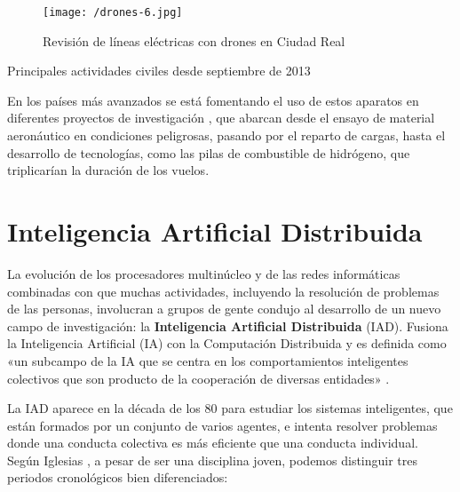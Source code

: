 \begin{figure}[!h]
\begin{center}
\texttt{[image: /drones-6.jpg]}
\caption[Revisión de líneas eléctricas con drones en Ciudad Real]{Revisión de líneas eléctricas con drones en Ciudad Real \cite{unionfenosa}}
\label{fig:unionfenosa}
\end{center}
\end{figure}

\begin{table}[!h]
 \centering
 {\small
 
 }
 \caption[Principales actividades civiles desde septiembre de 2013]
 {Principales actividades civiles desde septiembre de 2013 \cite{ambitocivil2}}
 \label{tab:ambitocivil2}
\end{table}

En los países más avanzados se está fomentando el uso de estos aparatos en diferentes proyectos de investigación \cite{UA}, que abarcan desde el ensayo de material aeronáutico en condiciones peligrosas, pasando por el reparto de cargas, hasta el desarrollo de tecnologías, como las pilas de combustible de hidrógeno, que triplicarían la duración de los vuelos.

\clearpage

\section{Inteligencia Artificial Distribuida}
\label{sec:inteligenciaartificial}

La evolución de los procesadores multinúcleo y de las redes informáticas combinadas con que muchas actividades, incluyendo la resolución de problemas de las personas, involucran a grupos de gente condujo al desarrollo de un nuevo campo de investigación: la \textbf{Inteligencia Artificial Distribuida} (\acs{IAD}). Fusiona la Inteligencia Artificial (\acs{IA}) con la Computación Distribuida y es definida como «un subcampo de la \acs{IA} que se centra en los comportamientos inteligentes colectivos que son producto de la cooperación de diversas entidades» \cite{IAD}.

La \acs{IAD} aparece en la década de los 80 para estudiar los sistemas inteligentes, que están formados por un conjunto de varios agentes, e intenta resolver problemas donde una conducta colectiva es más eficiente que una conducta individual. Según Iglesias \cite{IAD2}, a pesar de ser una disciplina joven, podemos distinguir tres periodos cronológicos bien diferenciados:

